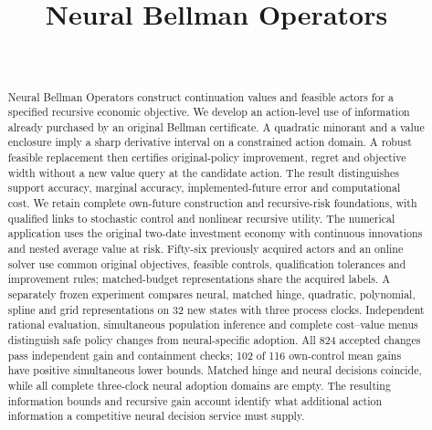 \documentclass[ecta,nameyear,draft]{econsocart}
\begin{document}
\begin{frontmatter}
\title{Neural Bellman Operators}
\begin{aug}
\author[id=au1,addressref={add1}]{~}
\address[id=add1]{Peking University}
\end{aug}
\begin{abstract}
Neural Bellman Operators construct continuation values and feasible actors for a
specified recursive economic objective. We develop an action-level use of
information already purchased by an original Bellman certificate. A quadratic
minorant and a value enclosure imply a sharp derivative interval on a constrained
action domain. A robust feasible replacement then certifies original-policy
improvement, regret and objective width without a new value query at the
candidate action. The result distinguishes support accuracy, marginal accuracy,
implemented-future error and computational cost. We retain complete own-future
construction and recursive-risk foundations, with qualified links to stochastic
control and nonlinear recursive utility. The numerical application uses the
original two-date investment economy with continuous innovations and nested
average value at risk. Fifty-six previously acquired actors and an online solver use common original
objectives, feasible controls, qualification tolerances and improvement rules;
matched-budget representations share the acquired labels. A separately
frozen experiment compares neural, matched hinge, quadratic, polynomial,
spline and grid representations on 32 new states with three process clocks.
Independent rational evaluation, simultaneous population inference and complete
cost--value menus distinguish safe policy changes from neural-specific adoption.
All 824 accepted changes pass independent gain and containment checks;
102 of 116 own-control mean gains have positive simultaneous lower bounds.
Matched hinge and neural decisions coincide, while all complete three-clock
neural adoption domains are empty. The resulting information bounds and
recursive gain account identify what additional action information a
competitive neural decision service must supply.
\end{abstract}
\begin{keyword}
\end{keyword}
\end{frontmatter}










\begingroup
\let\NBOBibliographyStart\thebibliography
\renewcommand{\thebibliography}[1]{\NBOBibliographyStart{#1}\raggedright}

\endgroup
\end{document}
